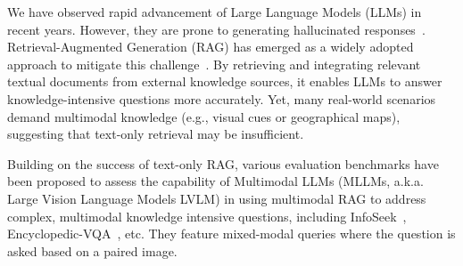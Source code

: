 We have observed rapid advancement of Large Language Models (LLMs) in recent years. However, they are prone to generating hallucinated responses~\cite{10.1145/3571730}. Retrieval-Augmented Generation (RAG) has emerged as a widely adopted approach to mitigate this challenge~\citep{NEURIPS2020_6b493230, karpukhin-etal-2020-dense, izacard-grave-2021-leveraging}. By retrieving and integrating relevant textual documents from external knowledge sources, it enables LLMs to answer knowledge-intensive questions more accurately. Yet, many real-world scenarios demand multimodal knowledge (e.g., visual cues or geographical maps), suggesting that text-only retrieval may be insufficient.


Building on the success of text-only RAG, various evaluation benchmarks have been proposed to assess the capability of Multimodal LLMs (MLLMs, a.k.a. Large Vision Language Models LVLM) in using multimodal RAG to address complex, multimodal knowledge intensive questions, including InfoSeek~\citep{chen-etal-2023-pre-trained}, Encyclopedic-VQA~\citep{Mensink_2023_ICCV}, etc. They feature mixed-modal queries where the question is asked based on a paired image.

